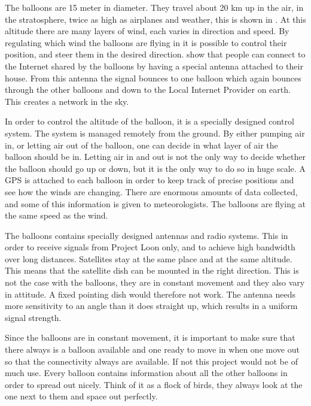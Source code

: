 The balloons are 15 meter in diameter. They travel about 20 km up in the air, in the stratosphere, twice as high as airplanes and weather, this is shown in . At this altitude there are many layers of wind, each varies in direction and speed. By regulating which wind the balloons are flying in it is possible to control their position, and steer them in the desired direction.  show that  people can connect to the Internet shared by the balloons by having a special antenna attached to their house. From this antenna the signal bounces to one balloon which again bounces through the other balloons and down to the Local Internet Provider on earth. This creates a network in the sky. 

In order to control the altitude of the balloon, it is a specially designed control system. The system is managed remotely from the ground. By either pumping air in, or letting air out of the balloon, one can decide in what layer of air the balloon should be in. Letting air in and out is not the only way to decide whether the balloon should go up or down, but it is the only way to do so in huge scale. A GPS is attached to each balloon in order to keep track of precise positions and see how the winds are changing. There are enormous amounts of data collected, and some of this information is given to meteorologists. The balloons are flying at the same speed as the wind.  

The balloons contains specially designed antennas and radio systems. This in order to receive signals from Project Loon only, and to achieve high bandwidth over long distances. Satellites stay at the same place and at the same altitude. This means that the satellite dish can be mounted in the right direction. This is not the case with the balloons, they are in constant movement and they also vary in attitude. A fixed pointing dish would therefore not work. The antenna needs more sensitivity to an angle than it does straight up, which results in a uniform signal strength. 

Since the balloons are in constant movement, it is important to make sure that there always is a balloon available and one ready to move in when one move out so that the connectivity always are available. If not this project would not be of much use. Every balloon contains information about all the other balloons in order to spread out nicely. Think of it as a flock of birds, they always look at the one next to them and space out perfectly.


